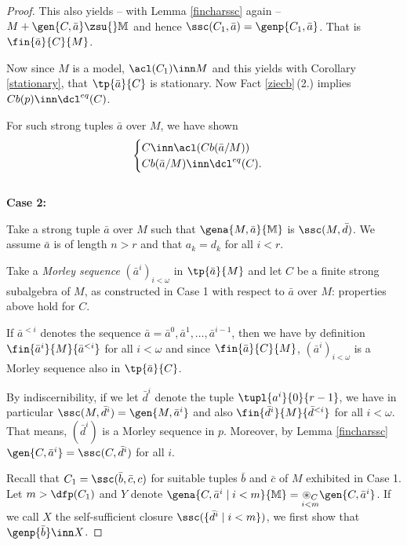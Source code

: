 \begin{proof}
This also yields -- with Lemma \ref{fincharssc} again --  $M+\gen{C,\bar a}\zsu{}\mathbb{M}$ and hence $\ssc(C_{1},\bar a)
=\genp{C_{1},\bar a}$. That is $\fin{\bar a}{C}{M}$.

\medskip
Now since $M$ is a model, %
$\acl(C_{1})\inn M$ %
and this yields with Corollary \ref{stationary}, that $\tp{\bar a}{C}$
is stationary. Now Fact \ref{ziecb}\,(2.) implies $Cb(p)\inn\dcl^{eq}(C)$.

For such strong tuples $\bar a$ over $M$, %
we have shown
\begin{gather}\label{cibbi}
\begin{cases}C\inn\acl(Cb(\bar a/M))\\
Cb(\bar a/M)\inn\dcl^{eq}(C).\end{cases}
\end{gather}\\[+1mm]\noindent
{\bf Case 2:}

\medskip
Take a strong tuple $\bar a$ over $M$ such that $\gena{M,\bar a}{\mathbb{M}}$ is $\ssc(M,\bar d)$.
We assume $\bar a$ is of length $n>r$ and that $a_{k}=d_{k}$ for all $i<r$.

Take a {\em Morley sequence} $(\bar a^{i})_{i<\omega}$ in $\tp{\bar a}{M}$ and let $C$ be a finite strong subalgebra of $M$,
as constructed in Case 1 with respect to $\bar a$ over $M$: properties  above hold for $C$.

If $\bar a^{<i}$ denotes the sequence $\bar a=\bar a^{0},\bar a^{1},\dots,\bar a^{i-1}$, then we have by definition
$\fin{\bar a^{i}}{M}{\bar a^{<i}}$ for all $i<\omega$ and since $\fin{\bar a}{C}{M}$, $(\bar a^{i})_{i<\omega}$ is a Morley sequence also in $\tp{\bar a}{C}$.

By indiscernibility, if we let $\bar d^{i}$ denote the tuple $\tupl{a^{i}}{0}{r-1}$, we have in particular $\ssc(M,\bar d^{i})=\gen{M,\bar a^{i}}$
and also $\fin{\bar d^{i}}{M}{\bar d^{<i}}$ for all $i<\omega$. That means, $(\bar d^{i})$ is a Morley sequence in $p$.
Moreover, by Lemma \ref{fincharssc} $\gen{C,\bar a^{i}}=\ssc(C,\bar d^{i})$ for all $i$.

\medskip
Recall that $C_{1}=\ssc(\bar b,\bar c,c)$ for suitable tuples $\bar b$ and $\bar c$ of $M$ exhibited in Case 1.
Let $m>\dfp(C_{1})$ and $Y$ denote $\gena{C,\bar a^{i}\mid i<m}{\mathbb{M}}=\underset{i<m}{{\circledast_{C}}}\gen{C,\bar a^{i}}$.
If we call $X$ the self-sufficient closure $\ssc(\{\bar d^{i}\mid i<m\})$, we first show that $\genp{\bar b}\inn X$.


\end{proof}
